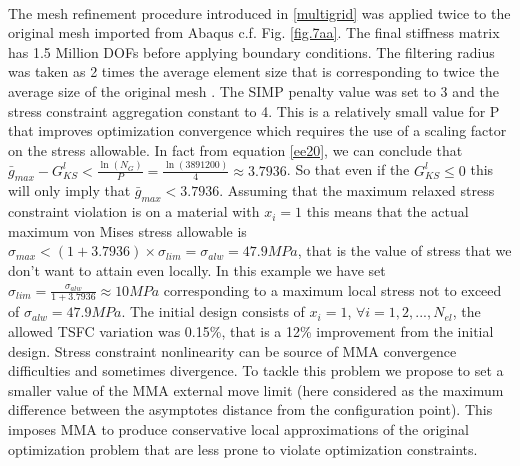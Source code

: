           \\
     The mesh refinement procedure introduced in \ref{multigrid} was applied twice to the original mesh imported from Abaqus c.f. Fig. \ref{fig.7aa}.
    The final stiffness matrix has 1.5 Million DOFs before applying boundary conditions. The filtering radius was taken as 2 times the average element size that is corresponding to twice the average size of the original mesh . The SIMP penalty value was set to 3 and the stress constraint aggregation constant to 4.
     This is a relatively small value for P that improves optimization convergence which requires the use of a scaling factor on the stress allowable. In fact from equation \ref{ee20}, we can conclude that $\bar{g}_{max}-G^{l}_{KS}<\frac{\ln\left(N_G\right)}{P}=\frac{\ln\left(3891200\right)}{4}\approx 3.7936$. So that even if the $G^{l}_{KS}\leq0$ this will only imply that $\bar{g}_{max}< 3.7936$. Assuming that the maximum relaxed stress constraint violation is on a material with $x_i=1$ this means that the actual maximum von Mises stress allowable is $ \sigma_{max}<(1+3.7936)\times \sigma_{lim} = \sigma_{alw}=47.9 MPa$, that is the value of stress that we don't want to attain even locally. In this example we have set $\sigma_{lim}=\frac{\sigma_{alw}}{1+3.7936}\approx 10 MPa$ corresponding to a maximum local stress not to exceed of $\sigma_{alw}=47.9MPa$.
     The initial design consists of $x_i=1$, $\forall i=1,2,...,N_{el}$, the allowed TSFC variation was 0.15\%, that is a 12\% improvement from the initial design.
    Stress constraint nonlinearity can be source of MMA convergence difficulties and sometimes divergence. To tackle this problem we propose to set a smaller value of the MMA external move limit (here considered as the maximum difference between the asymptotes distance from the configuration point). This imposes MMA to produce conservative local approximations of the original optimization problem that are less prone to violate optimization constraints.
